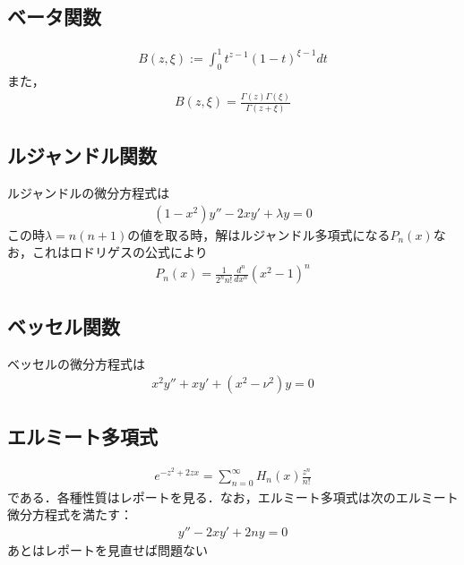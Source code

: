 \documentclass[12pt,dvipdfmx]{jsarticle}
\begin{document}
\subsection*{\large{ベータ関数}}
\begin{eqnarray}
  B(z,\xi) := \int_0^1 t^{z-1}(1-t)^{\xi-1}dt
\end{eqnarray}
また，
\begin{eqnarray}
  B(z,\xi) = \frac{\Gamma(z)\Gamma(\xi)}{\Gamma(z+\xi)}
\end{eqnarray}
\subsection*{\large{ルジャンドル関数}}
ルジャンドルの微分方程式は
\begin{eqnarray}
  (1-x^2)y'' -2xy' + \lambda y=0
\end{eqnarray}
この時$\lambda=n(n+1)$の値を取る時，解はルジャンドル多項式になる$P_n(x)$なお，これはロドリゲスの公式により
\begin{eqnarray}
  P_n(x) = \frac{1}{2^n n!}\frac{d^n}{dx^n}(x^2-1)^n
\end{eqnarray}
\subsection*{\large{ベッセル関数}}
ベッセルの微分方程式は
\begin{eqnarray}
  x^2y'' + xy' + (x^2-\nu^2)y=0
\end{eqnarray}
\subsection*{\large{エルミート多項式}}
\begin{eqnarray}
  e^{-z^2+2zx} = \sum_{n=0}^{\infty} H_n(x)\frac{z^n}{n!}
\end{eqnarray}
である．各種性質はレポートを見る．なお，エルミート多項式は次のエルミート微分方程式を満たす：
\begin{eqnarray}
  y''-2xy' + 2ny=0
\end{eqnarray}
あとはレポートを見直せば問題ない
\end{document}
